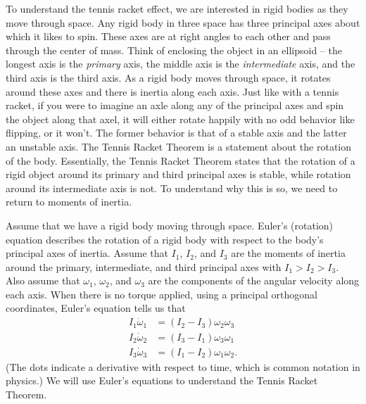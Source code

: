 To understand the tennis racket effect, we are interested in rigid bodies as they move through space. Any rigid body in three space has three principal axes about which it likes to spin. These axes are at right angles to each other and pass through the center of mass. Think of enclosing the object in an ellipsoid -- the longest axis is the \emph{primary} axis, the middle axis is the \emph{intermediate} axis, and the third axis is the third axis. As a rigid body moves through space, it rotates around these axes and there is inertia along each axis. Just like with a tennis racket, if you were to imagine an axle along any of the principal axes and spin the object along that axel, it will either rotate happily with no odd behavior like flipping, or it won't. The former behavior is that of a stable axis and the latter an unstable axis. The Tennis Racket Theorem is a statement about the rotation of the body. Essentially, the Tennis Racket Theorem states that the rotation of a rigid object around its primary and third principal axes is stable, while rotation around its intermediate axis is not. To understand why this is so, we need to return to moments of inertia. 

Assume that we have a rigid body moving through space. Euler's (rotation) equation describes the rotation of a rigid body with respect to the body's principal axes of inertia. Assume that $I_1$, $I_2$, and $I_3$ are the moments of inertia around the primary, intermediate, and third principal axes with $I_1 > I_2 > I_3$. Also assume that $\omega_1$, $\omega_2$, and $\omega_3$ are the components of the angular velocity along each axis. When there is no torque applied, using a principal orthogonal coordinates, Euler's equation tells us that 
\begin{align}
I_1 \dot{\omega}_1 &= (I_2-I_3) \omega_2 \omega_3 \label{eq:Euler_1} \\
I_2 \dot{\omega}_2 &= (I_3-I_1) \omega_3 \omega_1 \label{eq:Euler_2}  \\
I_3 \dot{\omega}_3 &= (I_1-I_2) \omega_1 \omega_2. \label{eq:Euler_3} 
\end{align}
(The dots indicate a derivative with respect to time, which is common notation in physics.) We will use Euler's equations to understand the Tennis Racket Theorem. 
 
